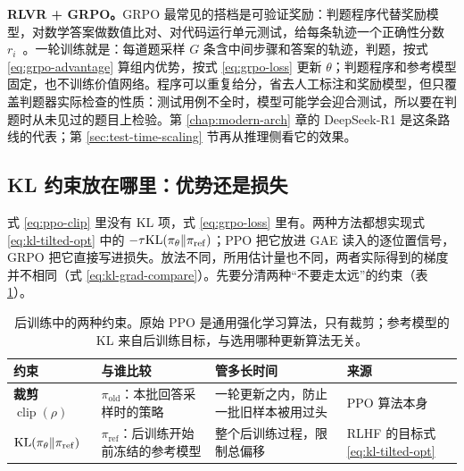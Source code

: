 \textbf{RLVR + GRPO。}GRPO 最常见的搭档是可验证奖励：判题程序代替奖励模型，对数学答案做数值比对、对代码运行单元测试，给每条轨迹一个正确性分数 \(r_i\)~\cite{shao2024grpo,deepseekr1}。一轮训练就是：每道题采样 \(G\) 条含中间步骤和答案的轨迹，判题，按式 \eqref{eq:grpo-advantage} 算组内优势，按式 \eqref{eq:grpo-loss} 更新 \(\theta\)；判题程序和参考模型固定，也不训练价值网络。程序可以重复给分，省去人工标注和奖励模型，但只覆盖判题器实际检查的性质：测试用例不全时，模型可能学会迎合测试，所以要在判题时从未见过的题目上检验。第 \ref{chap:modern-arch} 章的 DeepSeek-R1 是这条路线的代表；第 \ref{sec:test-time-scaling} 节再从推理侧看它的效果。

\subsection{KL 约束放在哪里：优势还是损失}
\label{sec:kl-placement}

式 \eqref{eq:ppo-clip} 里没有 KL 项，式 \eqref{eq:grpo-loss} 里有。两种方法都想实现式 \eqref{eq:kl-tilted-opt} 中的 \(-\tau\mathrm{KL}(\pi_\theta\Vert\pi_{\mathrm{ref}})\)；PPO 把它放进 GAE 读入的逐位置信号，GRPO 把它直接写进损失。放法不同，所用估计量也不同，两者实际得到的梯度并不相同（式 \eqref{eq:kl-grad-compare}）。先要分清两种“不要走太远”的约束（表 \ref{tab:two-constraints}）。

\begin{table}[H]
\centering\small
\begin{tabularx}{\textwidth}{>{\bfseries}p{30mm} X X X}
\toprule
约束 & 与谁比较 & 管多长时间 & 来源\\
\midrule
裁剪 \(\operatorname{clip}(\rho)\) & \(\pi_{\mathrm{old}}\)：本批回答采样时的策略 & 一轮更新之内，防止一批旧样本被用过头 & PPO 算法本身\\
\(\mathrm{KL}(\pi_\theta\Vert\pi_{\mathrm{ref}})\) & \(\pi_{\mathrm{ref}}\)：后训练开始前冻结的参考模型 & 整个后训练过程，限制总偏移 & RLHF 的目标式 \eqref{eq:kl-tilted-opt}\\
\bottomrule
\end{tabularx}
\caption{后训练中的两种约束。原始 PPO 是通用强化学习算法，只有裁剪；参考模型的 KL 来自后训练目标，与选用哪种更新算法无关。}
\label{tab:two-constraints}
\end{table}

